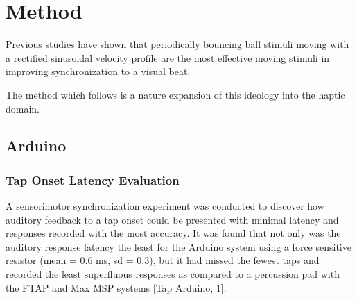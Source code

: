 \chapter{Method}


Previous studies have shown that periodically bouncing ball stimuli moving with a rectified sinusoidal velocity profile are the most effective moving stimuli in improving synchronization to a visual beat.~\cite{gan2015synchronization}

The method which follows is a nature expansion of this ideology into the haptic domain.


\section{Arduino}
\subsection{Tap Onset Latency Evaluation}

A sensorimotor synchronization experiment was conducted to discover how auditory feedback to a tap onset could be presented with minimal latency and responses recorded with the most accuracy. It was found that not only was the auditory response latency the least for the Arduino system using a force sensitive resistor (mean = 0.6 ms, sd = 0.3), but it had missed the fewest taps and recorded the least superfluous responses as compared to a percussion pad with the FTAP and Max MSP systems [Tap Arduino, 1].